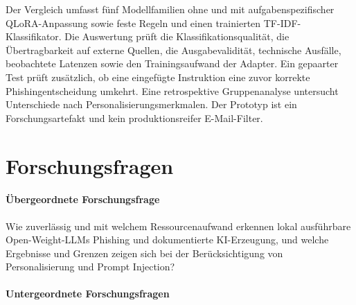 \documentclass[12pt,twoside=false,a4paper,parskip]{scrbook}
\begin{document}
Der Vergleich umfasst fünf Modellfamilien ohne und mit aufgabenspezifischer QLoRA-Anpassung sowie feste Regeln und einen trainierten TF-IDF-Klassifikator. Die Auswertung prüft die Klassifikationsqualität, die Übertragbarkeit auf externe Quellen, die Ausgabevalidität, technische Ausfälle, beobachtete Latenzen sowie den Trainingsaufwand der Adapter. Ein gepaarter Test prüft zusätzlich, ob eine eingefügte Instruktion eine zuvor korrekte Phishingentscheidung umkehrt. Eine retrospektive Gruppenanalyse untersucht Unterschiede nach Personalisierungsmerkmalen. Der Prototyp ist ein Forschungsartefakt und kein produktionsreifer E-Mail-Filter.

\section{Forschungsfragen}\label{sec:forschungsfragen}

\paragraph{Übergeordnete Forschungsfrage}

Wie zuverlässig und mit welchem Ressourcenaufwand erkennen lokal ausführbare Open-Weight-LLMs Phishing und dokumentierte KI-Erzeugung, und welche Ergebnisse und Grenzen zeigen sich bei der Berücksichtigung von Personalisierung und Prompt Injection?

\paragraph{Untergeordnete Forschungsfragen}
\end{document}
